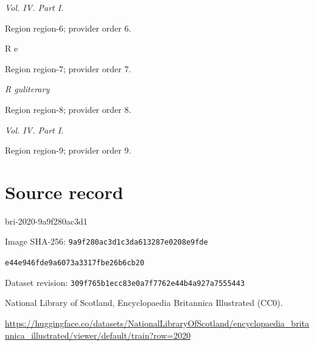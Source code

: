 \documentclass[11pt]{article}
\begin{document}
{\small\itshape Vol. IV. Part I.\par}

{\scriptsize\color{gray} Region region-6; provider order 6.\par}
\medskip

R e
\par

{\scriptsize\color{gray} Region region-7; provider order 7.\par}
\medskip

{\small\itshape R guliterary\par}

{\scriptsize\color{gray} Region region-8; provider order 8.\par}
\medskip

{\small\itshape Vol. IV. Part I.\par}

{\scriptsize\color{gray} Region region-9; provider order 9.\par}
\medskip
\newpage\section*{Source record}
bri-2020-9a9f280ac3d1\par
Image SHA-256: \texttt{9a9f280ac3d1c3da613287e0208e9fde}\par\texttt{e44e946fde9a6073a3317fbe26b6cb20}\par
Dataset revision: \texttt{309f765b1ecc83e0a7f7}\texttt{762e44b4a927a7555443}\par
National Library of Scotland, Encyclopaedia Britannica Illustrated (CC0).\par
\url{https://huggingface.co/datasets/NationalLibraryOfScotland/encyclopaedia_britannica_illustrated/viewer/default/train?row=2020}
\end{document}
